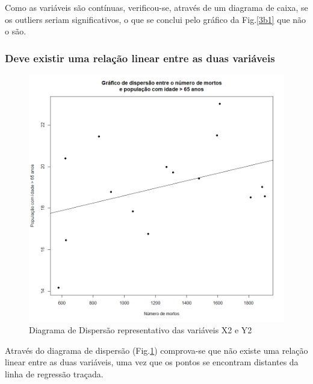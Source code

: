 \documentclass[conference]{IEEEtran}
\begin{document}
Como as variáveis são contínuas, verificou-se, através de um diagrama de caixa, se os outliers seriam significativos, o que se conclui pelo gráfico da Fig.\ref{3b1} que não o são.

\subsubsection{Deve existir uma relação linear entre as duas variáveis}

\begin{figure}[htbp]
\centerline{\includegraphics[width=0.95\columnwidth]{images/03.b.2.png}}
\caption{Diagrama de Dispersão representativo das variáveis X2 e Y2}
\label{3b2}
\end{figure}

Através do diagrama de dispersão (Fig.\ref{3b2}) comprova-se que não existe uma relação linear entre as duas variáveis, uma vez que os pontos se encontram distantes da linha de regressão traçada.
\end{document}
